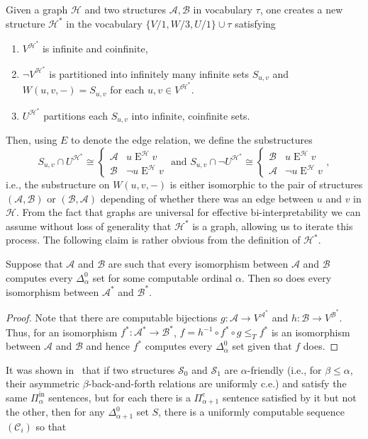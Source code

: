 \documentclass{amsart}
\newcommand\+[1]{\mathcal{#1}}
\renewcommand\*[1]{\mathbf{#1}}
\renewcommand\=[1]{\text{#1}}
\renewcommand\*[1]{\mathbf{#1}}
\newcommand{\A}{\mathcal{A}}
\newcommand{\B}{\mathcal{B}}
\newcommand{\Pinf}[1]{\Pi^{\mathrm{in}}_{#1}}
\newcommand{\Picom}[1]{\Pi^{\mathrm{c}}_{#1}}
\begin{document}
 Given a graph $\+H$ and two structures $\+A,\+B$ in vocabulary $\tau$, one creates a new structure $\+H^*$ in the vocabulary 
   $\{V/1, W/3, U/1\}\cup \tau$ satisfying
   \begin{enumerate}
     \item\label{it:vertset} $V^{\+H^*}$ is infinite and coinfinite,
     \item\label{it:partition} $\neg V^{\+H^*}$ is partitioned into infinitely many infinite sets $S_{u,v}$ and $W(u,v,-)=S_{u,v}$ for each $u,v\in V^{\+H^*}$.
     \item\label{it:pair} $U^{\+H^*}$ partitions each $S_{u,v}$ into infinite, coinfinite sets.
   \end{enumerate}
   Then, using $E$ to denote the edge relation, we define the substructures
   \[ S_{u,v}\cap U^{\+H^*}\cong \begin{cases} \+A & u \mathrel{E}^\+H v\\ \+B &\neg u\mathrel{E}^\+H v \end{cases}\text{ and }
      S_{u,v}\cap \neg U^{\+H^*}\cong \begin{cases} \+B & u \mathrel{E}^\+H v\\
     \+A & \neg u\mathrel{E}^\+H v \end{cases},\]
     i.e., the substructure on $W(u,v,-)$ is either isomorphic to the pair of structures $(\A,\B)$ or $(\B,\A)$ depending of whether there was an edge between $u$ and $v$ in $\+H$. From the fact that graphs are universal for effective bi-interpretability we can assume without loss of generality that $\+H^*$ is a graph, allowing us to iterate this process. The following claim is rather obvious from the definition of $\+H^*$.
     \begin{lemma}
       Suppose that $\+A$ and $\+B$ are such that every isomorphism between $\+A$ and $\+B$ computes every $\Delta^0_\alpha$ set for some computable ordinal $\alpha$. Then so does every isomorphism between $\+A^*$ and $\+B^*$.
     \end{lemma}
     \begin{proof}
       Note that there are computable bijections $g: \+A\to V^{\+A^*}$ and $h:\+B\to V^{\+B^*}$. Thus, for an isomorphism $f^*:\+A^*\to\+B^*$, $f=h^{-1}\circ f^*\circ g\leq_T f^*$ is an isomorphism between $\+A$ and $\+B$ and hence $f^*$ computes every $\Delta^0_\alpha$ set given that $f$ does.
     \end{proof}
    It was shown in~\cite[Lemma 5.1]{goncharov2005} that if two structures $\+S_0$ and $\+S_1$ are $\alpha$-friendly (i.e., for $\beta\leq \alpha$, their asymmetric $\beta$-back-and-forth relations are uniformly c.e.) and satisfy the same $\Pinf{\alpha}$ sentences, but for each there is a $\Picom{\alpha+1}$ sentence satisfied by it but not the other, then for any $\Delta^0_{\alpha+1}$ set $S$, there is a uniformly computable sequence $(\+C_i)$ so that
\end{document}
